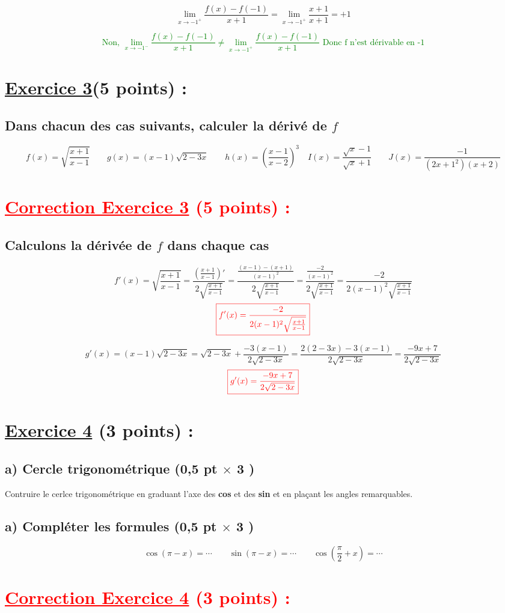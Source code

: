 \documentclass[12pt]{article}
\begin{document}
\[\lim_{x \to -1^{+}}\frac{f(x)-f(-1)}{x+1}=\lim_{x \to -1^{+}}\frac{x+1}{x+1}=+1\]

\textcolor{green}{\[\text{Non, }\lim_{x \to -1^{-}}\frac{f(x)-f(-1)}{x+1}\neq\lim_{x \to -1^{+}}\frac{f(x)-f(-1)}{x+1}\text{ Donc f n'est dérivable en -1}\]}
\section*{\underline{Exercice 3}(5 points) :}
\subsection*{ Dans chacun des cas suivants, calculer la dérivé de $f$}
\[
f(x)=\sqrt{\frac{x+1}{x-1}}\quad\quad g(x)=(x-1)\sqrt{2-3x}\quad\quad h(x)=(\frac{x-1}{x-2})^{3}\quad I(x)=\frac{\sqrt{x}-1}{\sqrt{x}+1}\quad\quad J(x)=\frac{-1}{(2x+1^{2})(x+2)}
\]
\section*{\textcolor{red}{\underline{Correction Exercice 3} (5 points) :}}
\subsection*{ Calculons la dérivée de $f$ dans chaque cas}
\[
f'(x)=\sqrt{\frac{x+1}{x-1}}=\frac{(\frac{x+1}{x-1})'}{2\sqrt{\frac{x+1}{x-1}}}=\frac{\frac{(x-1)-(x+1)}{(x-1)^{2}}}{2\sqrt{\frac{x+1}{x-1}}}=\frac{\frac{-2}{(x-1)^{2}}}{2\sqrt{\frac{x+1}{x-1}}}=\frac{-2}{2(x-1)^{2}\sqrt{\frac{x+1}{x-1}}}
\]
\[\textcolor{red}{\boxed{f'(x)=\frac{-2}{2(x-1)^{2}\sqrt{\frac{x+1}{x-1}}}}}\]

\[g'(x)=(x-1)\sqrt{2-3x}=\sqrt{2-3x}+\frac{-3(x-1)}{2\sqrt{2-3x}}=\frac{2(2-3x)-3(x-1)}{2\sqrt{2-3x}}=\frac{-9x+7}{2\sqrt{2-3x}}\]
\[\textcolor{red}{\boxed{g'(x)=\frac{-9x+7}{2\sqrt{2-3x}}}}\]
\section*{\underline{Exercice 4} (3 points) :}
\subsection*{a) Cercle trigonométrique (0,5 pt $\times$ 3 )}
Contruire le cerlce trigonométrique en graduant l'axe des \textbf{cos} et des 
\textbf{sin} et en plaçant les angles remarquables.
\subsection*{a) Compléter les formules (0,5 pt $\times$ 3 )}
\[\cos(\pi-x)=\cdots\quad\quad \sin(\pi-x)=\cdots\quad\quad \cos(\frac{\pi}{2}+x)=\cdots\]
\section*{\textcolor{red}{\underline{Correction Exercice 4} (3 points) :}}
\end{document}
